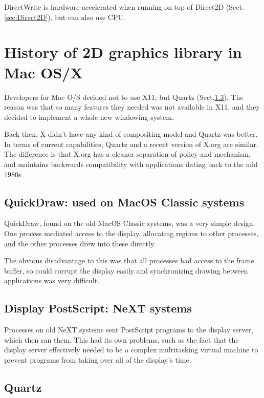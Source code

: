 DirectWrite is hardware-accelerated when running on top of Direct2D
(Sect.\ref{sec:Direct2D}), but can also use CPU.




\section{History of 2D graphics library in Mac OS/X}

Developers for Mac O/S decided not to use X11; but Quartz
(Sect.\ref{sec:Quartz}). The reason was that so many features they needed was
not available in X11, and they decided to implement a whole new windowing
system. 

Back then, X didn't have any kind of compositing model and Quartz was better.
In terms of current capabilities, Quartz and a recent version of X.org are
similar. The difference is that X.org has a cleaner separation of policy and
mechanism, and maintains backwards compatibility with applications dating back
to the mid 1980s
 

\subsection{QuickDraw: used on MacOS Classic systems}

 QuickDraw, found on the old MacOS Classic systems, was a very simple design.
One process mediated access to the display, allocating regions to other
processes, and the other processes drew into these directly.

The obvious disadvantage to this was that all processes had access to the frame
buffer, so could corrupt the display easily and synchronizing drawing between
applications was very difficult.

\subsection{Display PostScript: NeXT systems}

Processes on old NeXT systems sent PostScript programs to the display server,
which then ran them. This had its own problems, such as the fact that the
display server effectively needed to be a complex multitasking virtual machine
to prevent programs from taking over all of the display's time.



\subsection{Quartz}
\label{sec:Quartz}

